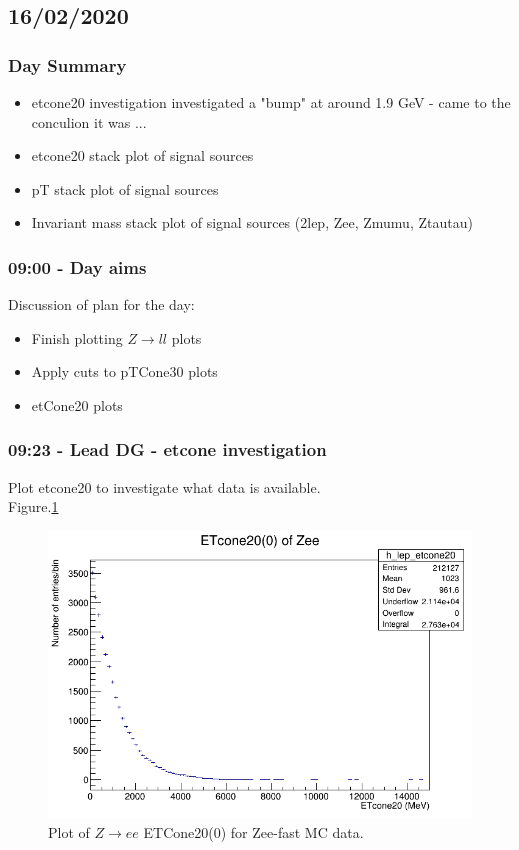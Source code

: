 \subsection*{\textbf{16/02/2020}}
\subsubsection*{Day Summary}
\begin{itemize}
    \item etcone20 investigation
    \subitem investigated a "bump" at around 1.9 GeV - came to the conculion it was ...
    \item etcone20 stack plot of signal sources
    \item pT stack plot of signal sources
    \item Invariant mass stack plot of signal sources (2lep, Zee, Zmumu, Ztautau)
\end{itemize}
\subsubsection*{\textbf{09:00} - Day aims}
Discussion of plan for the day:
\begin{itemize}
    \item Finish plotting $Z \rightarrow ll$ plots
    \item Apply cuts to pTCone30 plots
    \item etCone20 plots
\end{itemize}

\subsubsection*{09:23 - Lead DG - etcone investigation}
Plot etcone20 to investigate what data is available.
\\
Figure.\ref{fig:Zee-fast_ETcone20(0)_0-15GeV_16-02-21_09-34} 
\begin{figure}[h!]
    \centering
	\includegraphics[width=0.85\linewidth]{plots/16-02-2021/Zee-fast_ETcone20(0)_ 0-15GeV_16-02-21_09-34.png}
	\caption{Plot of $Z \rightarrow ee$ ETCone20(0) for Zee-fast MC data.}\label{fig:Zee-fast_ETcone20(0)_0-15GeV_16-02-21_09-34}
\end{figure}

